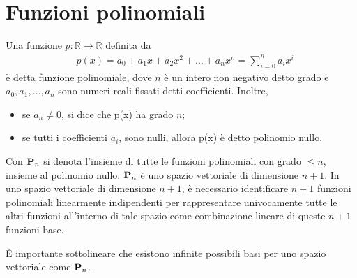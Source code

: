 \documentclass{article}
\begin{document}
\section{Funzioni polinomiali}
\begin{definition}
    Una funzione $p:\mathbb{R}\rightarrow \mathbb{R}$ definita da 
    \begin{equation} \label{eq:teorema_fondamentale_algebra}
       \begin{aligned}
           &
           p(x)=a_0+a_1x+a_2x^2+\ldots+a_nx^n=\displaystyle\sum_{i=0}^{n}a_ix^i
       \end{aligned} 
    \end{equation}
    è detta funzione polinomiale, dove $n$ è un intero non negativo detto 
    grado e $a_0,a_1,\ldots,a_n$ sono numeri reali fissati detti
    {coefficienti}. Inoltre,
    \begin{itemize}
        \item se $a_n\neq 0$, si dice che p(x) ha grado $n$; 
        \item se tutti i coefficienti $a_i$, sono nulli, 
            allora p(x) è detto polinomio nullo.
    \end{itemize}
\end{definition}
Con $\text{\textbf{P}}_n$ si denota l'insieme di tutte le funzioni polinomiali
con grado $\leq n$, insieme al polinomio nullo. $\text{\textbf{P}}_n$ è uno
spazio vettoriale di dimensione $n+1$. In uno spazio vettoriale di dimensione
$n+1$, è necessario identificare $n+1$ funzioni polinomiali linearmente
indipendenti per rappresentare univocamente tutte le altri funzioni all'interno 
di tale spazio come combinazione lineare di queste $n+1$ funzioni base.

È importante sottolineare che esistono infinite possibili basi per uno spazio
vettoriale come $\text{\textbf{P}}_n$.
\end{document}
